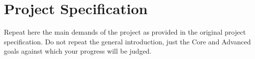 \chapter{Project Specification}

Repeat here the main demands of the project as provided in the original project specification. Do not repeat the general introduction, just the Core and Advanced goals against which your progress will be judged.

